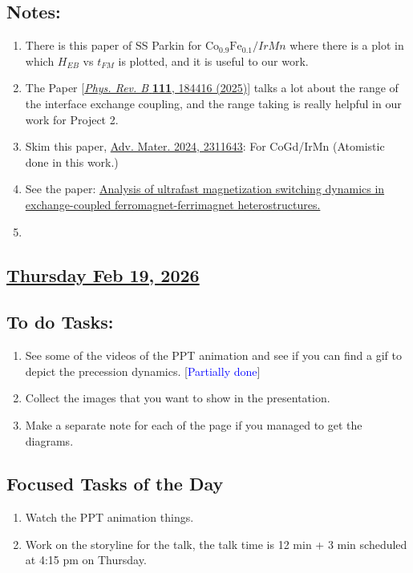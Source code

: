 \subsection*{Notes:}
\begin{enumerate}
    \item There is this paper of SS Parkin for $\mathrm{Co_{0.9}Fe_{0.1}}/IrMn$ where there is a plot in which $H_{EB}$ vs $t_{FM}$ is plotted, and it is useful to our work.
    \item The Paper [\href{https://doi.org/10.1103/PhysRevB.111.184416}{\textit{Phys. Rev. B} \textbf{111}, 184416 (2025)}] talks a lot about the range of the interface exchange coupling, and the range taking is really helpful in our work for Project 2.
    \item Skim this paper, \href{https://doi.org/10.1002/adma.202311643}{Adv. Mater. 2024, 2311643}: For CoGd/IrMn (Atomistic done in this work.)
    \item See the paper: \href{https://doi.org/10.1016/j.jmmm.2023.170680}{Analysis of ultrafast magnetization switching dynamics in exchange-coupled ferromagnet-ferrimagnet heterostructures.}
    \item 
\end{enumerate}
\subsection*{\underline{Thursday Feb 19, 2026}}
\subsection*{To do Tasks:}
\begin{enumerate}
    \item See some of the videos of the PPT animation and see if you can find a gif to depict the precession dynamics. [\textcolor{blue}{Partially done}]
    \item Collect the images that you want to show in the presentation. \xmark
    \item Make a separate note for each of the page if you managed to get the diagrams. \cmark
\end{enumerate}
\subsection*{Focused Tasks of the Day}
\begin{enumerate}[\ding{52}]  %
    \item Watch the PPT animation things. 
    \item Work on the storyline for the talk, the talk time is 12 min + 3 min scheduled at 4:15 pm on Thursday. 
\end{enumerate}

